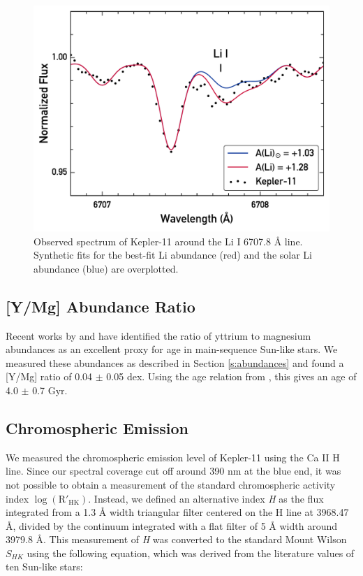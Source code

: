 \documentclass[twocolumn,trackchanges]{aastex61}
\begin{document}
\begin{figure}
\centering
\includegraphics[width=\columnwidth]{lithium}
\caption{Observed spectrum of Kepler-11 around the Li I 6707.8 \r{A} line. Synthetic fits for the best-fit Li abundance (red) and the solar Li abundance (blue) are overplotted.}
\label{fig:lithium}
\end{figure}

\vspace{8mm}


\subsection{[Y/Mg] Abundance Ratio}

Recent works by \citet{Nissen2015} and \citet{TucciMaia2016} have identified the ratio of yttrium to magnesium abundances as an excellent proxy for age in main-sequence Sun-like stars. We measured these abundances as described in Section \ref{s:abundances} and found a [Y/Mg] ratio of 0.04 $\pm$ 0.05 dex. Using the age relation from \citet{TucciMaia2016}, this gives an age of 4.0 $\pm$ 0.7 Gyr.

\subsection{Chromospheric Emission}

We measured the chromospheric emission level of Kepler-11 using the Ca II H line. Since our spectral coverage cut off around 390 nm at the blue end, it was not possible to obtain a measurement of the standard chromospheric activity index $\log(\mathrm{R'_{HK}})$. Instead, we defined an alternative index \textit{H} as the flux integrated from a 1.3 \r{A} width triangular filter centered on the H line at 3968.47 \r{A}, divided by the continuum integrated with a flat filter of 5 \r{A} width around 3979.8 \r{A}. This measurement of \textit{H} was converted to the standard Mount Wilson $S_{HK}$ using the following equation, which was derived from the literature values of ten Sun-like stars:
\end{document}
